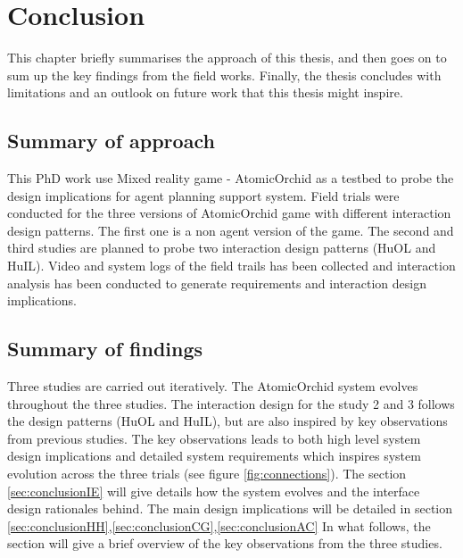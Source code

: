 \chapter{Conclusion}

This chapter briefly summarises the approach of this thesis, and then goes on to sum up the key findings from the field works. Finally, the thesis concludes with limitations and an outlook on future work that this thesis might inspire.\\

\section{Summary of approach}
This PhD work use Mixed reality game - AtomicOrchid as a testbed to probe the design implications for agent planning support system. Field trials were conducted for the three versions of AtomicOrchid game with different interaction design patterns. The first one is a non agent version of the game. The second and third studies are planned to probe two interaction design patterns (HuOL and HuIL). Video and system logs of the field trails has been collected and interaction analysis has been conducted to generate requirements and interaction design implications. \\


\section{Summary of findings}
Three studies are carried out iteratively. The AtomicOrchid system evolves throughout the three studies. The interaction design for the study 2 and 3 follows the design patterns (HuOL and HuIL), but are also inspired by key observations from previous studies. The key observations leads to both high level system design implications and detailed system requirements which inspires system evolution across the three trials (see figure \ref{fig:connections}).  The section \ref{sec:conclusionIE}  will give details how the system evolves and the interface design rationales behind. The main design implications will be detailed in section \ref{sec:conclusionHH},\ref{sec:conclusionCG},\ref{sec:conclusionAC}  In what follows, the section will give a brief overview of the key observations from the three studies.\\ 



